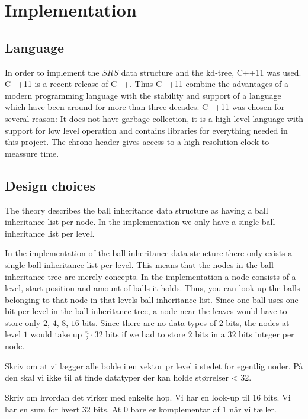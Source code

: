 \chapter{Implementation}

\section{Language}

In order to implement the $SRS$ data structure and the kd-tree, C++11 was used. C++11 is a recent release of C++. Thus C++11 combine the advantages of a modern programming language with the stability and support of a language which have been around for more than three decades. C++11 was chosen for several reason: It does not have garbage collection, it is a high level language with support for low level operation and contains libraries for everything needed in this project. The chrono header gives access to a high resolution clock to meassure time. 

\section{Design choices}

The theory describes the ball inheritance data structure as having a ball inheritance list per node. In the implementation we only have a single ball inheritance list per level. 

In the implementation of the ball inheritance data structure there only exists a single ball inheritance list per level. This means that the nodes in the ball inheritance tree are merely concepts. In the implementation a node consists of a level, start position and amount of balls it holds. Thus, you can look up the balls belonging to that node in that levels ball inheritance list. Since one ball uses one bit per level in the ball inheritance tree, a node near the leaves would have to store only $2$, $4$, $8$, $16$ bits. Since there are no data types of $2$ bits, the nodes at level $1$ would take up $\frac{n}{2}\cdot 32$ bits if we had to store $2$ bits in a $32$ bits integer per node.



Skriv om at vi lægger alle bolde i en vektor pr level i stedet for egentlig noder. På den skal vi ikke til at finde datatyper der kan holde størrelser < 32.

Skriv om hvordan det virker med enkelte hop. Vi har en look-up til 16 bits. Vi har en sum for hvert 32 bits. At 0 bare er komplementar af 1 når vi tæller.
